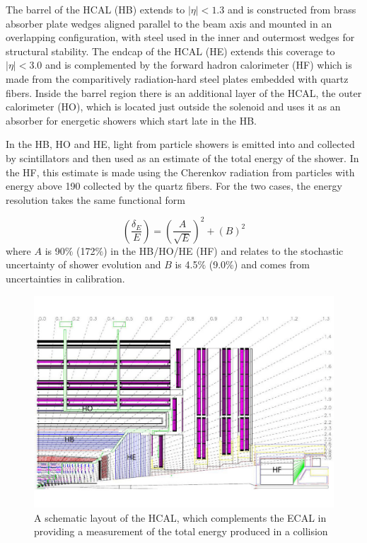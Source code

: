 The barrel of the HCAL (HB) extends to $|\eta|<1.3$ 
 and is constructed from brass absorber plate wedges aligned parallel 
 to the beam axis and mounted in an overlapping configuration,
 with steel used in the inner and outermost
 wedges for structural stability.
The endcap of the HCAL (HE) extends this coverage to $|\eta|<3.0$
 and is complemented by the forward hadron calorimeter (HF)
 which is made from the comparitively radiation-hard 
 steel plates embedded with quartz fibers.
Inside the barrel region there is an additional layer of the
 HCAL, the outer calorimeter (HO), which is located just
 outside the solenoid and uses it as an absorber 
 for energetic showers which start late in the HB.

In the HB, HO and HE, light from particle showers
 is emitted into and collected by scintillators
 and then used as an estimate of the total energy of the shower.
In the HF, this estimate is made using the Cherenkov 
 radiation from particles with energy above 190 \keV
 collected by the quartz fibers.
For the two cases, the energy resolution takes the same
 functional form 

\begin{equation}\label{eq:hcal_res}
 \left(\frac{\delta_E}{E}\right) =  \left(\frac{A}{\sqrt{E}}\right)^2 + (B)^2 
\end{equation}
 where $A$ is 90$\%$ (172$\%$) in the HB/HO/HE (HF)
  and relates to the stochastic uncertainty of shower evolution
 and $B$ is 4.5$\%$ (9.0$\%$) and comes from uncertainties in calibration.


\begin{figure}[htbp]
\includegraphics[width=\textwidth]{pdfs/experiment/cms_hcal.pdf}
\caption{
 A schematic layout of the HCAL, which complements the ECAL
  in providing a measurement of the total energy produced 
  in a collision
 }
\label{fig:hcal}
\end{figure}
 

